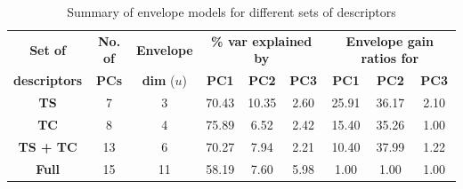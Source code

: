 \documentclass[11pt]{llncs}
\begin{document}
\begin{table}[t]\centering
    \begin{tabular}{|c|c|c||c|c|c|c|c|c|}\hline
    \textbf{Set of} & \textbf{No. of} & \textbf{Envelope} &	\multicolumn{3}{c|}{\textbf{\% var explained by}}	& \multicolumn{3}{c|}{\textbf{Envelope gain ratios for}}\\\cline{4-9}
    \textbf{descriptors}                  & \textbf{PCs}                                                 & \textbf{dim} ($u$) & \hspace{.2cm}\textbf{PC1}\hspace{.2cm}	& \hspace{.2cm}\textbf{PC2}\hspace{.2cm}   & \hspace{.2cm}\textbf{PC3}\hspace{.2cm}  & \hspace{.2cm}\textbf{PC1}\hspace{.2cm}	& \hspace{.2cm}\textbf{PC2}\hspace{.2cm}   & \hspace{.2cm}\textbf{PC3}\hspace{.2cm}  \\\hline\hline
    \textbf{TS}                 & 7                                                 & 3                        & 70.43 & 10.35 & 2.60 & 25.91              & 36.17 & 2.10 \\ \hline
    \textbf{TC}                 & 8                                                 & 4                        & 75.89 & 6.52  & 2.42 & 15.40              & 35.26 & 1.00 \\\hline
    \textbf{TS + TC}            & 13                                                & 6                        & 70.27 & 7.94  & 2.21 & 10.40              & 37.99 & 1.22 \\\hline
    \textbf{Full} & 15 & 11 & 58.19 & 7.60 & 5.98 & 1.00 & 1.00 & 1.00 \\\hline
    \end{tabular}
    \caption{Summary of envelope models for different sets of descriptors}
\end{table}
\end{document}
